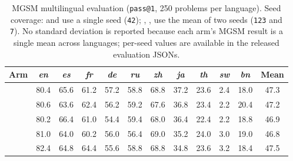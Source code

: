 \begin{table}[t]
\centering\small
\caption{MGSM multilingual evaluation (\texttt{pass@1}, 250 problems per
language).
Seed coverage: \base{} and \armD{} use a single seed (\texttt{42});
\armA{}, \armB{}, \armC{} use the mean of two seeds
(\texttt{123} and \texttt{7}).
No standard deviation is reported because each arm's MGSM result is a
single mean across languages; per-seed values are available in the
released evaluation JSONs.}
\label{tab:mgsm}
\begin{tabular}{lccccccccccc}
\toprule
Arm & \textit{en} & \textit{es} & \textit{fr} & \textit{de} & \textit{ru} & \textit{zh} & \textit{ja} & \textit{th} & \textit{sw} & \textit{bn} & Mean \\
\midrule
\base{} & 80.4 & 65.6 & 61.2 & 57.2 & 58.8 & 68.8 & 37.2 & 23.6 & 2.4 & 18.0 & 47.3 \\
\armA{} & 80.6 & 63.6 & 62.4 & 56.2 & 59.2 & 67.6 & 36.8 & 23.4 & 2.2 & 20.4 & 47.2 \\
\armB{} & 80.2 & 66.4 & 61.0 & 54.4 & 59.4 & 68.0 & 36.4 & 22.4 & 2.2 & 18.8 & 46.9 \\
\armC{} & 81.0 & 64.0 & 60.2 & 56.0 & 56.4 & 69.0 & 35.2 & 24.0 & 3.0 & 19.0 & 46.8 \\
\armD{} & 82.4 & 64.8 & 64.4 & 55.6 & 58.8 & 68.8 & 34.8 & 23.6 & 3.2 & 18.4 & 47.5 \\
\bottomrule
\end{tabular}
\end{table}
